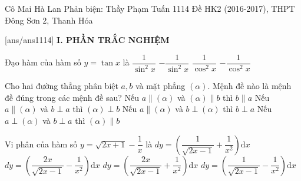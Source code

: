 \begin{name}
		{Cô Mai Hà Lan \newline Phản biện: Thầy Phạm Tuấn}
		{1114 Đề HK2 (2016-2017), THPT Đông Sơn 2, Thanh Hóa}
	\end{name}
	\setcounter{ex}{0}\setcounter{bt}{0}
	[ans/ans1114]
\noindent\textbf{I. PHẦN TRẮC NGHIỆM}
\begin{ex}%
	Đạo hàm của hàm số $y = \tan x$ là
	\choice
	{$\dfrac{1}{\sin^2 x}$}
            {$-\dfrac{1}{\sin^2 x}$}
            {\True $\dfrac{1}{\cos^2 x}$}
            {$-\dfrac{1}{\cos^2 x}$}
\end{ex}

\begin{ex}%
	Cho hai đường thẳng phân biệt $a,b$ và mặt phẳng $(\alpha)$. Mệnh đề nào là mệnh đề đúng trong các mệnh đề sau?
	\choice
	{Nếu $a \parallel (\alpha)$ và $(\alpha) \parallel b$ thì $b \parallel a$}
	{Nếu $a \parallel (\alpha)$ và $b \perp a $ thì $(\alpha) \perp b$}
	{\True Nếu $a \parallel (\alpha)$ và $b \perp (\alpha)$ thì $b \perp a$}
	{Nếu $a\perp (\alpha)$ và $b \perp a$ thì $(\alpha) \parallel b$}
\end{ex}


\begin{ex}%
	Vi phân của hàm số $y = \sqrt{2x + 1} - \dfrac{1}{x}$ là 
	\choice
	{\True $dy = \left( \dfrac{1}{\sqrt{2x - 1}} + \dfrac{1}{x^2} \right) \mathrm{d}x$}
	{$dy = \left( \dfrac{2x}{\sqrt{2x - 1}} - \dfrac{1}{x^2} \right) \mathrm{d}x$}
	{$dy = \left( \dfrac{2x}{\sqrt{2x - 1}} + \dfrac{1}{x^2} \right) \mathrm{d}x$}
	{$dy = \left( \dfrac{1}{\sqrt{2x - 1}} - \dfrac{1}{x^2} \right) \mathrm{d}x$}
\end{ex}

